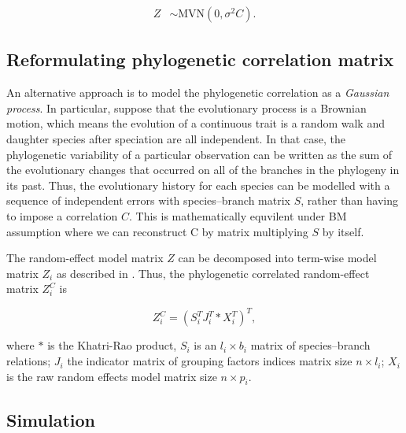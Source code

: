 \begin{align}
Z & \sim \textrm{MVN}(0,\sigma^{2}C).
\end{align}

\subsection{Reformulating phylogenetic correlation matrix}

An alternative approach is to model the phylogenetic correlation as a \textit{Gaussian process}. 
In particular, suppose that the evolutionary process is a Brownian motion, which means the evolution of a continuous trait is a random walk and daughter species after speciation are all independent.  
In that case, the phylogenetic variability of a particular observation can be written as the sum of the evolutionary changes that occurred on all of the branches in the phylogeny in its past. 
Thus, the evolutionary history for each species can be modelled with a sequence of independent errors with species--branch matrix $S$, rather than having to impose a correlation $C$. 
This is mathematically equvilent under BM assumption where we can reconstruct C by matrix multiplying $S$ by itself.

The random-effect model matrix $Z$ can be decomposed into term-wise model matrix $Z_{i}$ as described in \citet{bates2015fitting}.
Thus, the phylogenetic correlated random-effect matrix $Z^{C}_{i}$ is

\begin{equation}
Z^{C}_{i} = (S^{T}_{i}J^{T}_{i} \ast X^{T}_{i})^{T},
\end{equation}


where $\ast$ is the Khatri-Rao product, $S_{i}$ is an $l_{i} \times b_{i}$ matrix of species--branch relations; $J_{i}$ the indicator matrix of grouping factors indices matrix size $n \times l_{i}$; $X_{i}$ is the raw random effects model matrix size $n \times p_{i}$. 

\subsection{Simulation}

